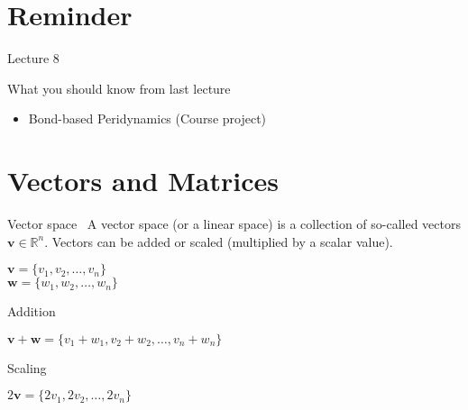 \documentclass[12pt,t]{beamer}
\title{\coursename}
\subtitle{Lecture 9: Linear algebra with Blaze}
\date {
 \tiny \url{\courseurl}
\vspace{2cm}
\doclicenseThis  
  
}
\begin{document}
 {
    \frame {
        \titlepage
    }
}

\frame{

\tableofcontents

}


\section{Reminder}
\begin{frame}{Lecture 8}
\begin{block}{What you should know from last lecture}
\begin{itemize}
\item Bond-based Peridynamics (Course project)
\end{itemize}
\end{block}
\end{frame}

\section{Vectors and Matrices}


\begin{frame}{Vector space~\cite{hefferonlinear,scheick1997linear}}
A vector space (or a linear space) is a collection of so-called vectors $\mathbf{v}\in \mathbb{R}^n$. Vectors can be added or scaled (multiplied by a scalar value).

\begin{center}
$\mathbf{v} = \lbrace v_1,v_2,\ldots,v_n \rbrace $ \\
$\mathbf{w} = \lbrace w_1,w_2,\ldots,w_n \rbrace $
\end{center}

\begin{block}{Addition}
\begin{center}
$\mathbf{v} + \mathbf{w} = \lbrace v_1+w_1,v_2+w_2,\ldots,v_n+w_n \rbrace $
\end{center}
\end{block}

\begin{block}{Scaling}
\begin{center}
$ 2 \mathbf{v} = \lbrace 2v_1,2v_2,\ldots,2v_n \rbrace $
\end{center}
\end{block}

\end{frame}
\end{document}
